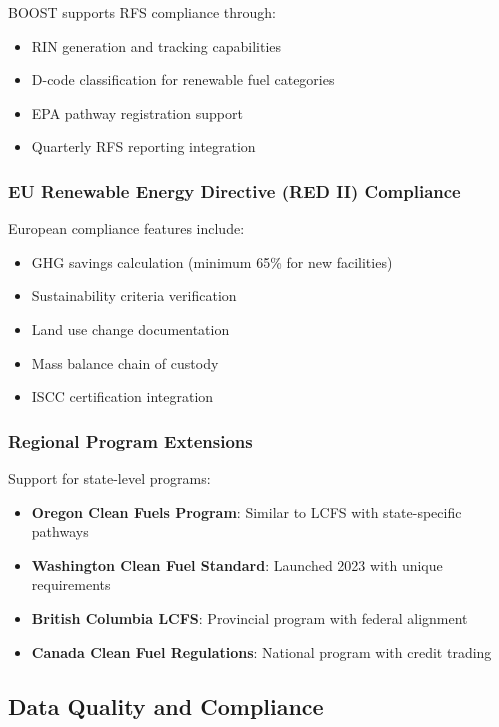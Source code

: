 BOOST supports RFS compliance through:

\begin{itemize}
    \item RIN generation and tracking capabilities
    \item D-code classification for renewable fuel categories
    \item EPA pathway registration support
    \item Quarterly RFS reporting integration
\end{itemize}

\subsubsection{EU Renewable Energy Directive (RED II) Compliance}

European compliance features include:

\begin{itemize}
    \item GHG savings calculation (minimum 65\% for new facilities)
    \item Sustainability criteria verification
    \item Land use change documentation
    \item Mass balance chain of custody
    \item ISCC certification integration
\end{itemize}

\subsubsection{Regional Program Extensions}

Support for state-level programs:

\begin{itemize}
    \item \textbf{Oregon Clean Fuels Program}: Similar to LCFS with state-specific pathways
    \item \textbf{Washington Clean Fuel Standard}: Launched 2023 with unique requirements
    \item \textbf{British Columbia LCFS}: Provincial program with federal alignment
    \item \textbf{Canada Clean Fuel Regulations}: National program with credit trading
\end{itemize}

\subsection{Data Quality and Compliance}
\label{sec:lcfs-data-quality}

